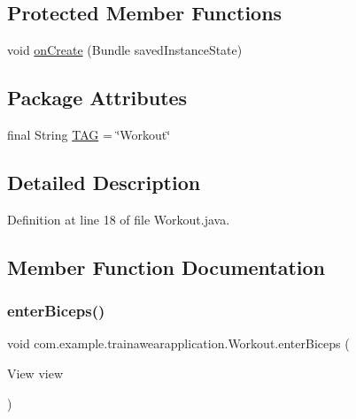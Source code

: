 \subsection*{Protected Member Functions}
\begin{DoxyCompactItemize}
\item 
void \mbox{\hyperlink{classcom_1_1example_1_1trainawearapplication_1_1_workout_a1a8beb733b991b8fc2b0844d77b2caa6}{on\+Create}} (Bundle saved\+Instance\+State)
\end{DoxyCompactItemize}
\subsection*{Package Attributes}
\begin{DoxyCompactItemize}
\item 
final String \mbox{\hyperlink{classcom_1_1example_1_1trainawearapplication_1_1_workout_a889fbfa6c39a37795c280c6a81685956}{T\+AG}} = \char`\"{}Workout\char`\"{}
\end{DoxyCompactItemize}


\subsection{Detailed Description}


Definition at line 18 of file Workout.\+java.



\subsection{Member Function Documentation}
\mbox{\label{classcom_1_1example_1_1trainawearapplication_1_1_workout_a394e2b083ee2f81e83d424a1054b8724}} 
\subsubsection{\texorpdfstring{enterBiceps()}{enterBiceps()}}
{\footnotesize\ttfamily void com.\+example.\+trainawearapplication.\+Workout.\+enter\+Biceps (\begin{DoxyParamCaption}\item[{View}]{view }\end{DoxyParamCaption})\hspace{0.3cm}{\ttfamily [inline]}}



